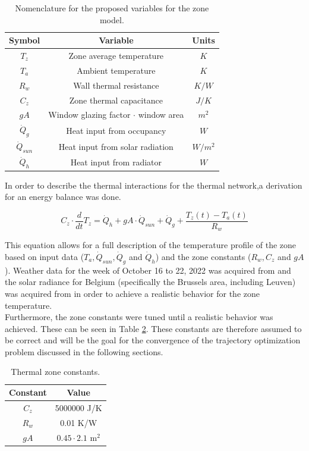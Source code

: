 \begin{table}[H]
\centering
\begin{tabular}{c|c|c}
Symbol & Variable & Units \\
\hline
\hline
$T_z$ & Zone average temperature & $K$\\
$T_a$ & Ambient temperature & $K$\\
$R_w$ & Wall thermal resistance & $K/W$\\
$C_z$ & Zone thermal capacitance & $J/K$\\
$gA$ & Window glazing factor $\cdot$ window area & $m^2$\\
$\dot{Q}_g$ & Heat input from occupancy & $W$\\
$\dot{Q}_{sun}$ & Heat input from solar radiation & $W/m^2$\\
$\dot{Q}_h$ & Heat input from radiator & $W$
\end{tabular}
\caption{Nomenclature for the proposed variables for the zone model.}
\label{tab:nomenclature_model}
\end{table}

In order to describe the thermal interactions for the thermal network,a derivation for an energy balance was done.

\begin{equation}
C_z \cdot \frac{d}{dt} T_z = \dot{Q}_h + gA \cdot \dot{Q}_{sun} + \dot{Q}_g + \frac{T_z(t)-T_a(t)}{R_w}
\label{eq:energy_balance}
\end{equation}

This equation allows for a full description of the temperature profile of the zone based on input data ($T_a, \dot{Q}_{sun}, \dot{Q}_g$ and $\dot{Q}_h$) and the zone constants ($R_w, C_z$ and $gA$). Weather data for the week of October 16 to 22, 2022 was acquired from \cite{nooa_2022} and the solar radiance for Belgium (specifically the Brussels area, including Leuven) was acquired from \cite{kunstmann} in order to achieve a realistic behavior for the zone temperature. \\

Furthermore, the zone constants were tuned until a realistic behavior was achieved. These can be seen in Table \ref{tab:constants}. These constants are therefore assumed to be correct and will be the goal for the convergence of the trajectory optimization problem discussed in the following sections. 

\begin{table}[H]
\centering
\begin{tabular}{c|c}
Constant & Value\\
\hline
\hline
$C_z$ & 5000000 J/K\\
$R_w$ & 0.01 K/W\\
$gA$ & $0.45\cdot2.1$ m$^2$ 
\end{tabular}
\caption{Thermal zone constants.}
\label{tab:constants}
\end{table}
